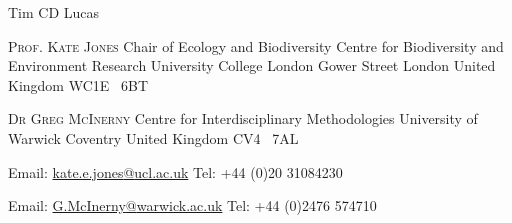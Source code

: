 \documentclass{scrartcl}
\begin{document}
\begin{cv}{Tim {\Large CD} Lucas}
{\color{Maroon}}\vspace{-1em}

\begin{multicols}{2}
\begin{footnotesize}
\textsc{Prof. Kate Jones}\newline
Chair of Ecology and Biodiversity\newline
Centre for Biodiversity and Environment Research\newline
University College London\newline
Gower Street\newline
London\newline
United Kingdom\newline
{\scriptsize WC}1{\scriptsize E} \ 6{\scriptsize BT}

\vfill
\columnbreak
\textsc{Dr Greg McInerny}\newline
Centre for Interdisciplinary Methodologies\newline
University of Warwick\newline
Coventry\newline
United Kingdom\newline
{\scriptsize CV}4 \ {\scriptsize 7AL}

\end{footnotesize}
\end{multicols}
\vspace{-0.5cm}
\begin{multicols}{2}
\begin{footnotesize}
Email: \href{mailto:kate.e.jones@ucl.ac.uk}{kate.e.jones{\scriptsize @}ucl.ac.uk}\newline
Tel: +44 (0)20 31084230
\columnbreak

Email: \href{mailto:g.mcinerny@warwick.ac.uk}{G.McInerny{\scriptsize @}warwick.ac.uk}\vspace{-0.8mm}\newline
Tel: +44 (0)2476 574710
\end{footnotesize}
\end{multicols}




\end{cv}
\end{document}
